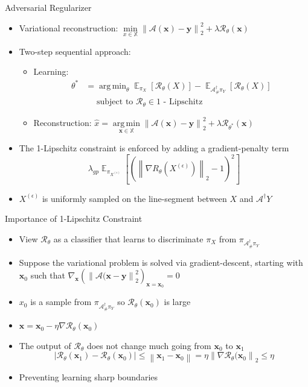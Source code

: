 \documentclass{beamer}
\newcommand{\norm}[1]{\left\lVert#1\right\rVert}
\DeclareMathOperator*{\argmin}{arg\,min}
\DeclareMathOperator{\EX}{\mathbb{E}}
\begin{document}
\begin{frame}{Adversarial Regularizer}
\begin{itemize}
\item Variational reconstruction: $\min\limits_{x \in \mathbb{X}} \norm{\mathcal{A}(\pmb{x}) - \pmb{y}}_{2}^{2} + \lambda \mathcal{R}_{\theta}(\pmb{x})$
\item Two-step sequential approach:
\begin{itemize}
\item Learning:
\begin{align*}
\theta^{*} &= \argmin_{\theta} \EX_{\pi_{X}} \left[ \mathcal{R}_{\theta}(X) \right] - 
\EX_{\mathcal{A}_{\text{\#}}^{\dagger}\pi_{Y}} \left[ \mathcal{R}_{\theta}(X) \right] \\[.5em]
&\quad\text{ subject to } \mathcal{R}_{\theta} \in \text{1 - Lipschitz}
\end{align*}
\item Reconstruction: $\hat{x} = \argmin\limits_{\pmb{x} \in \mathbb{X}} \norm{\mathcal{A}(\pmb{x}) - \pmb{y}}_{2}^{2} + \lambda \mathcal{R}_{\theta^{*}}(\pmb{x})$
\end{itemize}
\item The 1-Lipschitz constraint is enforced by adding a gradient-penalty term
$$
\lambda_{gp} \EX_{\pi_{X^{(\epsilon)}}}\left[
\left( \norm{\nabla R_{\theta}\left( X^{(\epsilon)} \right) }_{2} - 1 \right)^{2}
\right]
$$
\item $X^{(\epsilon)}$ is uniformly sampled on the line-segment between $X$ and $\mathcal{A}^{\dagger}Y$
\end{itemize}
\end{frame}

\begin{frame}{Importance of 1-Lipschitz Constraint}
\begin{itemize}
\item View $\mathcal{R}_{\theta}$ as a classifier that learns to discriminate $\pi_{X}$ from $\pi_{\mathcal{\mathcal{A}_{\text{\#}}^{\dagger}} \pi_{Y}}$
\item Suppose the variational problem is solved via gradient-descent, starting with $\pmb{x}_{0}$ such that $\nabla_{\pmb{x}} \left( \norm{\mathcal{A}(\pmb{x} - \pmb{y}}_{2}^{2} \right)_{\pmb{x} = \pmb{x}_0} = 0$
\item $x_{0}$ is a sample from $\pi_{\mathcal{\mathcal{A}_{\text{\#}}^{\dagger}} \pi_{Y}}$ so $\mathcal{R}_{\theta}(\pmb{x}_{0})$ is large
\item $\pmb{x} = \pmb{x}_0 - \eta \nabla \mathcal{R}_{\theta}(\pmb{x}_0)$
\item The output of $\mathcal{R}_{\theta}$ does not change much going from $\pmb{x}_0$ to $\pmb{x}_1$
$$
|\mathcal{R}_{\theta}(\pmb{x}_1) - \mathcal{R}_{\theta}(\pmb{x}_0)|
\leq \norm{\pmb{x}_1 - \pmb{x}_0} = \eta \norm{\nabla \mathcal{R}_{\theta}(\pmb{x}_0}_{2} 
\leq \eta
$$
\item Preventing learning sharp boundaries
\end{itemize}
\end{frame}
\end{document}

